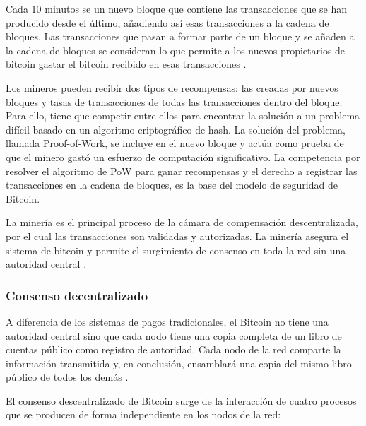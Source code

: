 \vspace{5mm}

\noindent Cada 10 minutos se  un nuevo bloque que contiene las transacciones que se han producido desde el 
último, añadiendo así esas transacciones a la cadena de bloques. Las transacciones que pasan a formar parte de un bloque 
y se añaden a la cadena de bloques se consideran  lo que permite a los nuevos propietarios de bitcoin 
gastar el bitcoin recibido en esas transacciones \cite{antonopoulos2014mastering}.

\vspace{5mm}

\noindent Los mineros pueden recibir dos tipos de recompensas: las creadas por nuevos bloques y tasas de transacciones 
de todas las transacciones dentro del bloque. Para ello, tiene que competir entre ellos para encontrar la solución a 
un problema difícil basado en un algoritmo criptográfico de hash. La solución del problema, llamada Proof-of-Work, 
se incluye en el nuevo bloque y actúa como prueba de que el minero gastó un esfuerzo de computación significativo. 
La competencia por resolver el algoritmo de PoW para ganar recompensas y el derecho a registrar las transacciones 
en la cadena de bloques, es la base del modelo de seguridad de Bitcoin.

\vspace{5mm}

\noindent La minería es el principal proceso de la cámara de compensación descentralizada, por el cual las transacciones 
son validadas y autorizadas. La minería asegura el sistema de bitcoin y permite el surgimiento de consenso en toda la 
red sin una autoridad central \cite{antonopoulos2014mastering}.

\subsubsection*{Consenso decentralizado}

A diferencia de los sistemas de pagos tradicionales, el Bitcoin no tiene una autoridad central sino que cada nodo tiene
una copia completa de un libro de cuentas público como registro de autoridad. Cada nodo de la red comparte la 
información transmitida y, en conclusión, ensamblará una copia del mismo libro público de todos los demás 
\cite{antonopoulos2014mastering}.

\vspace{5mm}

\noindent El consenso descentralizado de Bitcoin surge de la interacción de cuatro procesos que se producen de forma 
independiente en los nodos de la red:

